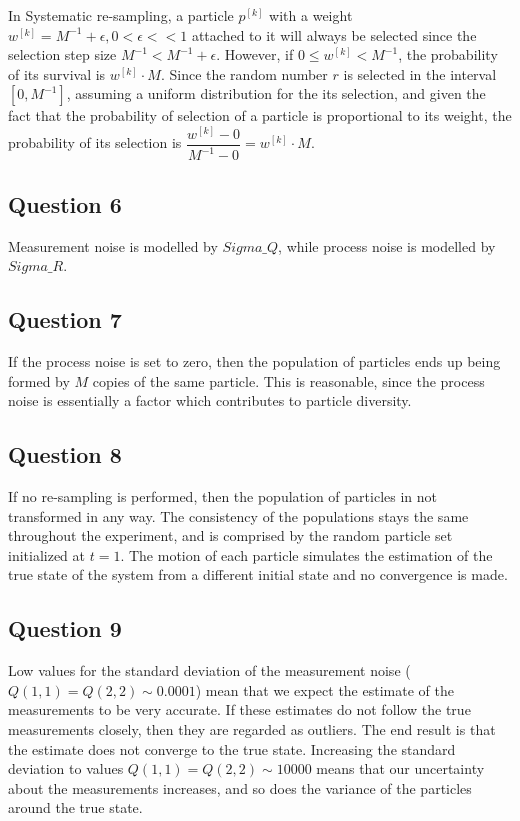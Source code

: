 In Systematic re-sampling, a particle $p^{[k]}$ with a weight $w^{[k]} = M^{-1} + \epsilon, 0 < \epsilon << 1$ attached to it will always be selected since
the selection step size $M^{-1} < M^{-1} + \epsilon$. However, if $0 \leq w^{[k]} < M^{-1}$, the probability of its survival is $w^{[k]} \cdot M$. Since
the random number $r$ is selected in the interval $[0, M^{-1}]$, assuming a uniform distribution for the its selection, and given the fact that the probability of
selection of a particle is proportional to its weight, the probability of its selection is $\dfrac{w^{[k]} - 0}{M^{-1} - 0} = w^{[k]} \cdot M$.

\subsection{Question 6}

Measurement noise is modelled by $Sigma\_Q$, while process noise is modelled by $Sigma\_R$.

\subsection{Question 7}

If the process noise is set to zero, then the population of particles ends up being formed by $M$ copies of the same particle. This is reasonable, since
the process noise is essentially a factor which contributes to particle diversity.

\subsection{Question 8}

If no re-sampling is performed, then the population of particles in not transformed in any way. The consistency of the populations stays the same throughout
the experiment, and is comprised by the random particle set initialized at $t=1$. The motion of each particle simulates the estimation of the true state of the system
from a different initial state and no convergence is made.

\subsection{Question 9}

Low values for the standard deviation of the measurement noise ($Q(1,1) = Q(2,2) \sim 0.0001$) mean that we expect the estimate of the measurements to be very accurate. 
If these estimates do not follow the true measurements closely, then they are regarded as outliers. The end result is that the estimate does not converge to 
the true state. Increasing the standard deviation to values $Q(1,1) = Q(2,2) \sim 10000$ means that our uncertainty about the measurements increases, and so does
the variance of the particles around the true state.

